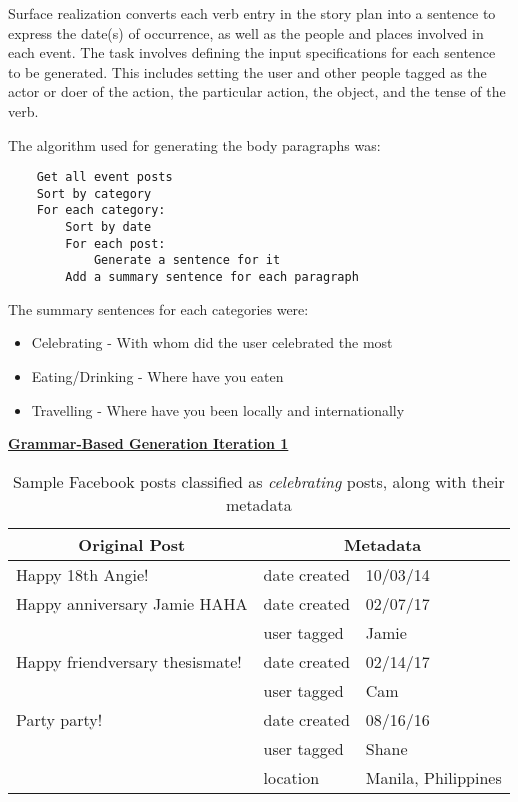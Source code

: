 Surface realization converts each verb entry in the story plan into a sentence to express the date(s) of occurrence, as well as the people and places involved in each event. The task involves defining the input specifications for each sentence to be generated. This includes setting the user and other people tagged as the actor or doer of the action, the particular action, the object, and the tense of the verb.

The algorithm used for generating the body paragraphs was:

\begin{lstlisting}
	Get all event posts
	Sort by category
	For each category:
		Sort by date
		For each post:
			Generate a sentence for it
		Add a summary sentence for each paragraph
\end{lstlisting}

The summary sentences for each categories were:
\begin{itemize}
	\item Celebrating - With whom did the user celebrated the most
	\item Eating/Drinking - Where have you eaten
	\item Travelling - Where have you been locally and internationally
\end{itemize}

\underline{\textbf{Grammar-Based Generation Iteration 1}} \newline
\begin{table}[ph!]   
	\centering
	\caption{Sample Facebook posts classified as \textit{celebrating} posts, along with their metadata} \vspace{0.25em}
	\begin{tabular}  {|p{2in}|p{1.5in}|p{1.5in}|}  \hline
    \multicolumn{1}{|c|}{Original Post} & \multicolumn{2}{c|}{Metadata}\\ \hline
	Happy 18th Angie! &  date created & 10/03/14 \\ \hline
	
	{Happy anniversary Jamie HAHA} &  {date created} &{02/07/17} \\\cline{2-1}
	& {user tagged} & {Jamie} \\\hline
	
	{Happy friendversary thesismate!} &  {date created} & {02/14/17} \\\cline{2-1}
	&  {user tagged} &{Cam} \\\hline
	
	{Party party!} &  {date created} & {08/16/16} \\\cline{2-2}
	&  {user tagged} & {Shane} \\\cline{2-2}
	&  {location} & {Manila, Philippines} \\\hline
	
	\end{tabular}
	\label{tab:GrammarRules-celeb}
\end{table}

